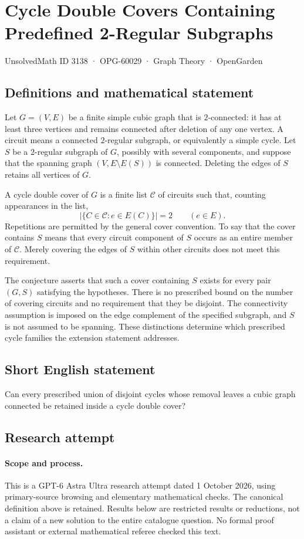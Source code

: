 \documentclass[11pt,a4paper]{article}
\begin{document}
\section*{Cycle Double Covers Containing Predefined 2-Regular Subgraphs}\label{3138}
{\small UnsolvedMath ID 3138 · OPG-60029 · Graph Theory · OpenGarden}
\subsection{Definitions and mathematical statement}
Let $G=(V,E)$ be a finite simple cubic graph that is $2$-connected:
it has at least three vertices and remains connected after deletion
of any one vertex. A circuit means a connected $2$-regular subgraph,
or equivalently a simple cycle. Let $S$ be a $2$-regular subgraph
of $G$, possibly with several components, and suppose that the
spanning graph $(V,E\setminus E(S))$ is connected. Deleting the edges
of $S$ retains all vertices of $G$.

A cycle double cover of $G$ is a finite list $\mathcal C$ of circuits
such that, counting appearances in the list,
\[
 \bigl|\{C\in\mathcal C:e\in E(C)\}\bigr|=2
 \qquad(e\in E).
\]
Repetitions are permitted by the general cover convention. To say
that the cover contains $S$ means that every circuit component of
$S$ occurs as an entire member of $\mathcal C$. Merely covering the
edges of $S$ within other circuits does not meet this requirement.

The conjecture asserts that such a cover containing $S$ exists for
every pair $(G,S)$ satisfying the hypotheses. There is no prescribed
bound on the number of covering circuits and no requirement that
they be disjoint. The connectivity assumption is imposed on the
edge complement of the specified subgraph, and $S$ is not assumed
to be spanning. These distinctions determine which prescribed
cycle families the extension statement addresses.
\subsection{Short English statement}
Can every prescribed union of disjoint cycles whose removal leaves a cubic graph connected be retained inside a cycle double cover?
\subsection{Research attempt}
\paragraph{Scope and process.}
This is a GPT-6 Astra Ultra research attempt dated 1 October 2026, using
primary-source browsing and elementary mathematical checks. The canonical
definition above is retained. Results below are restricted results or
reductions, not a claim of a new solution to the entire catalogue question.
No formal proof assistant or external mathematical referee checked this text.
\end{document}
